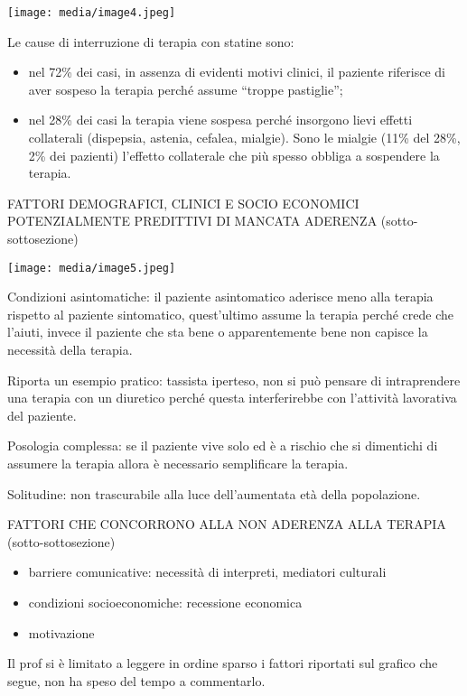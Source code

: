 \documentclass[]{article}
\begin{document}
\texttt{[image: media/image4.jpeg]}

Le cause di interruzione di terapia con statine sono:

\begin{itemize}
\item
  nel 72\% dei casi, in assenza di evidenti motivi clinici, il paziente
  riferisce di aver sospeso la terapia perché assume ``troppe
  pastiglie'';
\item
  nel 28\% dei casi la terapia viene sospesa perché insorgono lievi
  effetti collaterali (dispepsia, astenia, cefalea, mialgie). Sono le
  mialgie (11\% del 28\%, 2\% dei pazienti) l'effetto collaterale che
  più spesso obbliga a sospendere la terapia.
\end{itemize}

FATTORI DEMOGRAFICI, CLINICI E SOCIO ECONOMICI POTENZIALMENTE PREDITTIVI
DI MANCATA ADERENZA (sotto-sottosezione)

\texttt{[image: media/image5.jpeg]}

Condizioni asintomatiche: il paziente asintomatico aderisce meno alla
terapia rispetto al paziente sintomatico, quest'ultimo assume la terapia
perché crede che l'aiuti, invece il paziente che sta bene o
apparentemente bene non capisce la necessità della terapia.

Riporta un esempio pratico: tassista iperteso, non si può pensare di
intraprendere una terapia con un diuretico perché questa interferirebbe
con l'attività lavorativa del paziente.

Posologia complessa: se il paziente vive solo ed è a rischio che si
dimentichi di assumere la terapia allora è necessario semplificare la
terapia.

Solitudine: non trascurabile alla luce dell'aumentata età della
popolazione.

FATTORI CHE CONCORRONO ALLA NON ADERENZA ALLA TERAPIA
(sotto-sottosezione)

\begin{itemize}
\item
  barriere comunicative: necessità di interpreti, mediatori culturali
\item
  condizioni socioeconomiche: recessione economica
\item
  motivazione
\end{itemize}

Il prof si è limitato a leggere in ordine sparso i fattori riportati sul
grafico che segue, non ha speso del tempo a commentarlo.
\end{document}
